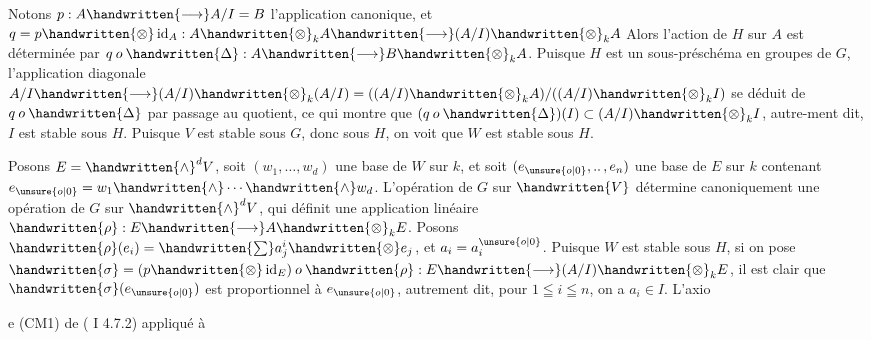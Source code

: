 Notons $p:A\handwritten{\longrightarrow}A/I=B$ l'application canonique, et $q=p\handwritten{\otimes}\operatorname{id}_A:A\handwritten{\otimes}_k A\handwritten{\longrightarrow}(A/I)\handwritten{\otimes}_k A$ Alors l'action de $H$ sur $A$ est déterminée par $q\mathbin{o}\handwritten{\Delta}:A\handwritten{\longrightarrow}B\handwritten{\otimes}_k A$. Puisque $H$ est un sous-préschéma en groupes de $G$, l'application diagonale $A/I\handwritten{\longrightarrow}(A/I)\handwritten{\otimes}_k(A/I)=((A/I)\handwritten{\otimes}_k A)/((A/I)\handwritten{\otimes}_k I)$ se déduit de $q\mathbin{o}\handwritten{\Delta}$ par passage au quotient, ce qui montre que $(q\mathbin{o}\handwritten{\Delta})(I)\subset(A/I)\handwritten{\otimes}_k I$, autre-\linebreak ment dit, $I$ est stable sous $H$. Puisque $V$ est stable sous $G$, donc sous $H$, on voit que $W$ est stable sous $H$.

Posons $E=\handwritten{\wedge}^d V$, soit $(w_1,\ldots,w_d)$ une base de $W$ sur $k$, et soit $(e_{\unsure{o|0}},\mathinner{..},e_n)$ une base de $E$ sur $k$ contenant $e_{\unsure{o|0}}=w_1\handwritten{\wedge}\cdots\handwritten{\wedge}w_d$. L'opération de $G$ sur $\handwritten{V}$ détermine canoniquement une opération de $G$ sur $\handwritten{\wedge}^d V$, qui définit une application linéaire $\handwritten{\rho}:E\handwritten{\longrightarrow}A\handwritten{\otimes}_k E$. Posons $\handwritten{\rho}(e_i)=\handwritten{\sum}a_j^i\handwritten{\otimes}e_j$, et $a_i=a_i^{\unsure{o|0}}$. Puisque $W$ est stable sous $H$, si on pose $\handwritten{\sigma}=(p\handwritten{\otimes}\operatorname{id}_E)\mathbin{o}\handwritten{\rho}:E\handwritten{\longrightarrow}(A/I)\handwritten{\otimes}_k E$, il est clair que $\handwritten{\sigma}(e_{\unsure{o|0}})$ est proportionnel à $e_{\unsure{o|0}}$, autrement dit, pour $1\leqq i\leqq n$, on a $a_i\in I$. L'axioe (CM1) de ( I 4.7.2) appliqué à

